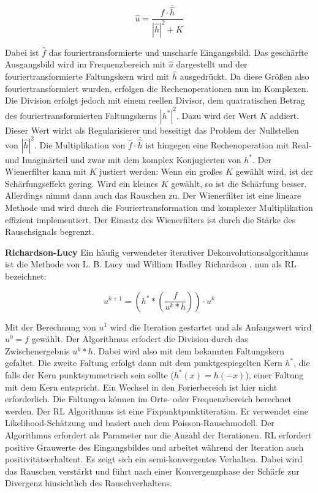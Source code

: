 \documentclass[a4paper,12pt]{article}
\begin{document}
\begin{equation} \label{eq:wiener}
\hat{u} = \frac{\hat{f}\cdot\bar{\hat{h}}} {|\hat{h}|^{2}+K}
\end{equation}

Dabei ist $\hat{f}$ das fouriertransformierte und unscharfe Eingangsbild. Das
geschärfte Ausgangsbild wird im Frequenzbereich mit $\hat{u}$ dargestellt und
der fouriertransformierte Faltungskern wird mit $\hat{h}$ ausgedrückt. Da diese
Größen also fouriertransformiert wurden, erfolgen die Rechenoperationen nun
im Komplexen. Die Division 
erfolgt jedoch mit einem reellen Divisor, dem quatratischen Betrag des
fouriertransformierten Faltungskerns $|h^*|^2$.
Dazu wird der Wert $K$ addiert. Dieser Wert wirkt als Regularisierer und
beseitigt das Problem der Nullstellen von $|\hat{h}|^{2}$. Die Multiplikation von
$\hat{f} \cdot \bar {\hat{h}}$ ist hingegen eine Rechenoperation mit Real- und
Imaginärteil und zwar mit dem komplex Konjugierten von $h^{*}$. Der Wienerfilter
kann mit $K$ justiert werden: Wenn ein großes $K$ gewählt wird, ist der
Schärfungseffekt gering. Wird ein kleines $K$ gewählt, so ist die Schärfung
besser. Allerdings nimmt dann auch das Rauschen zu. Der Wienerfilter ist eine
lineare Methode und wird durch die Fouriertransformation und komplexer
Multiplikation effizient implementiert. Der Einsatz des Wienerfilters ist durch
die Stärke des Rauschsignals begrenzt.


\textbf{Richardson-Lucy} \cite{richardson,lucy}
Ein häufig verwendeter iterativer Dekonvolutions\-algorithmus ist die Methode
von L. B. Lucy \cite{lucy} und William Hadley Richardson \cite{richardson}, nun als
RL bezeichnet:

\begin{equation} \label{eq:rl}
u^{k+1}= \left( h^* * \left( \frac{f}{u^{k}*h}\right) \right) \cdot{u^{k}}
\end{equation}

Mit der Berechnung von $u^{1}$ wird die Iteration gestartet und als Anfangswert
wird $u^{0} = f$ gewählt. Der Algorithmus erfodert die Division durch das
Zwischenergebnis $u^k*h$. Dabei wird also mit dem bekannten Faltungskern
gefaltet. Die zweite Faltung erfolgt dann mit dem punktgespiegelten Kern $h^*$,
die falls der Kern punktsymmetrisch sein sollte ($h^*(x) = h(-x)$), einer
Faltung mit dem Kern entspricht. Ein Wechsel in den Forierbereich ist hier nicht
erforderlich. Die Faltungen können im Orts- oder Frequenzbereich berechnet
werden. Der RL Algorithmus ist eine
Fixpunktpunktiteration.
Er verwendet eine Likelihood-Schätzung und basiert auch dem
Poisson-\-Rauschmodell.
Der Algorithmus erfordert als Parameter nur die Anzahl der Iterationen. 
RL erfordert positive Grauwerte des Eingangsbildes und
arbeitet während der Iteration auch positivitätserhaltent. Es zeigt sich ein semi-konvergentes Verhalten. 
Dabei wird das Rauschen verstärkt und führt nach einer Konvergenzphase der
Schärfe zur Divergenz hinsichtlich des Rauschverhaltens.
 
\end{document}
